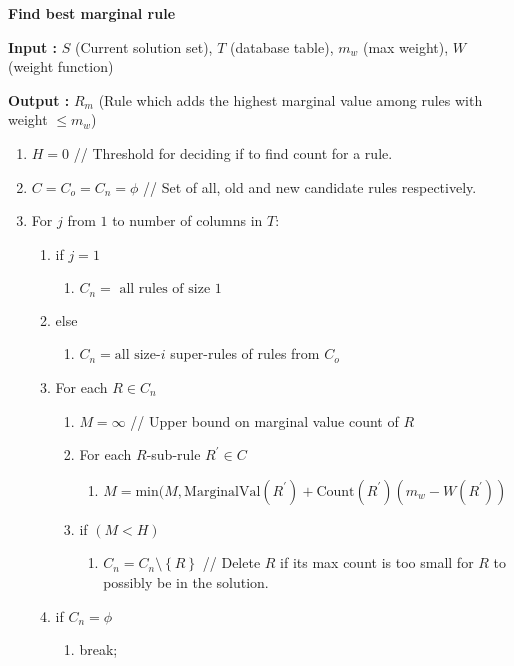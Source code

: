 \documentclass{sig-alternate}
\begin{document}
\begin{framed}
\textbf{Find best marginal rule}

\textbf{Input :} $S$ (Current solution set), $T$ (database table), $m_w$ (max weight), $W$ (weight function)

\textbf{Output :} $R_m$ (Rule which adds the highest marginal value among rules with weight $\leq m_w$)
\begin{enumerate}
\item $H = 0$ // Threshold for deciding if to find count for a rule.
\item $C = C_o = C_n = \phi$ // Set of all, old and new candidate rules respectively.
\item For $j$ from $1$ to number of columns in $T$:
\begin{enumerate}[label*=\arabic*.]
\item if $j = 1$
\begin{enumerate}[label*=\arabic*.]
\item $C_n = \text{ all rules of size } 1$
\end{enumerate}
\item else 
\begin{enumerate}[label*=\arabic*.]
\item $C_n = \text{all size-}i$ super-rules of rules from $C_o$
\end{enumerate}
\item For each $R \in C_n$
\begin{enumerate}[label*=\arabic*.]
\item $M =\infty$ // Upper bound on marginal value count of $R$
\item For each $R$-sub-rule $R^{\prime} \in C$  
\begin{enumerate}[label*=\arabic*.]
\item $M = \text{min}(M, \text{MarginalVal}(R^{\prime}) + \text{Count}(R^{\prime})(m_w - W(R^{\prime}))$
\end{enumerate} 
\item if $(M < H)$ 
\begin{enumerate}[label*=\arabic*.]
\item $C_n = C_n \setminus \left\lbrace R \right\rbrace$ // Delete $R$ if its max count is too small for $R$ to possibly be in the solution.
\end{enumerate} 
\end{enumerate}
\item if $C_n = \phi$
\begin{enumerate}[label*=\arabic*.]
\item break;

\end{enumerate}
\end{enumerate}
\end{enumerate}
\end{framed}
\end{document}
